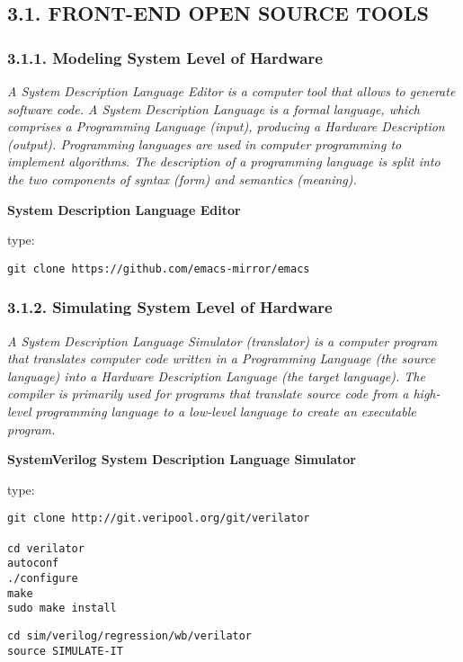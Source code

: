 \documentclass[]{article}
\begin{document}
\subsection{3.1. FRONT-END OPEN SOURCE
TOOLS}\label{front-end-open-source-tools}

\subsubsection{3.1.1. Modeling System Level of
Hardware}\label{modeling-system-level-of-hardware}

\emph{A System Description Language Editor is a computer tool that
allows to generate software code. A System Description Language is a
formal language, which comprises a Programming Language (input),
producing a Hardware Description (output). Programming languages are
used in computer programming to implement algorithms. The description of
a programming language is split into the two components of syntax (form)
and semantics (meaning).}

\textbf{System Description Language Editor}

type:

\begin{verbatim}
git clone https://github.com/emacs-mirror/emacs
\end{verbatim}

\subsubsection{3.1.2. Simulating System Level of
Hardware}\label{simulating-system-level-of-hardware}

\emph{A System Description Language Simulator (translator) is a computer
program that translates computer code written in a Programming Language
(the source language) into a Hardware Description Language (the target
language). The compiler is primarily used for programs that translate
source code from a high-level programming language to a low-level
language to create an executable program.}

\textbf{SystemVerilog System Description Language Simulator}

type:

\begin{verbatim}
git clone http://git.veripool.org/git/verilator

cd verilator
autoconf
./configure
make
sudo make install
\end{verbatim}

\begin{verbatim}
cd sim/verilog/regression/wb/verilator
source SIMULATE-IT
\end{verbatim}
\end{document}
